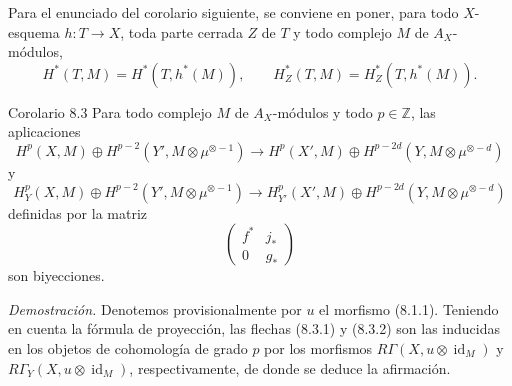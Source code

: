 Para el enunciado del corolario siguiente, se conviene en poner, para todo $X$-esquema $h:T\to X$, toda parte cerrada $Z$ de $T$ y todo complejo $M$ de $A_X$-módulos,
\[
H^*(T,M)=H^*(T,h^*(M)),\qquad
H^*_Z(T,M)=H^*_Z(T,h^*(M)).
\]

\begin{statement}{Corolario 8.3}
Para todo complejo $M$ de $A_X$-módulos y todo $p\in\mathbb Z$, las aplicaciones
\[
H^p(X,M)\oplus H^{p-2}(Y',M\otimes\mu^{\otimes -1})
\to
H^p(X',M)\oplus H^{p-2d}(Y,M\otimes\mu^{\otimes -d})
\tag{8.3.1}
\]
y
\[
H_Y^p(X,M)\oplus H^{p-2}(Y',M\otimes\mu^{\otimes -1})
\to
H_{Y'}^p(X',M)\oplus H^{p-2d}(Y,M\otimes\mu^{\otimes -d})
\tag{8.3.2}
\]
definidas por la matriz
\[
\begin{pmatrix}
f^*&j_*\\
0&g_*
\end{pmatrix}
\]
son biyecciones.
\end{statement}

\emph{Demostración.} Denotemos provisionalmente por $u$ el morfismo (8.1.1). Teniendo en cuenta la fórmula de proyección, las flechas (8.3.1) y (8.3.2) son las inducidas en los objetos de cohomología de grado $p$ por los morfismos $R\Gamma(X,u\otimes\operatorname{id}_M)$ y $R\Gamma_Y(X,u\otimes\operatorname{id}_M)$, respectivamente, de donde se deduce la afirmación.
